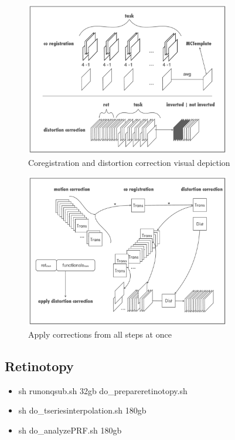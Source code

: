 \documentclass[12pt,a4paper]{scrartcl}
\begin{document}
\begin{figure}[h]
\begin{center}
\includegraphics[width=0.8\textwidth]{coregdist}
\caption[Coregistration and distortion correction visual depiction]{Coregistration and distortion correction visual depiction}
\end{center}
\end{figure}
\begin{figure}[h]
\begin{center}
\includegraphics[width=0.8\textwidth]{applycorr}
\caption[Apply corrections from all steps at once]{Apply corrections from all steps at once}
\end{center}
\end{figure}

\FloatBarrier

\subsection{Retinotopy}
\begin{itemize}
\item sh runonqsub.sh 32gb do\_prepareretinotopy.sh 
\item sh do\_tseriesinterpolation.sh 180gb
\item sh do\_analyzePRF.sh 180gb
\end{itemize}
\end{document}
